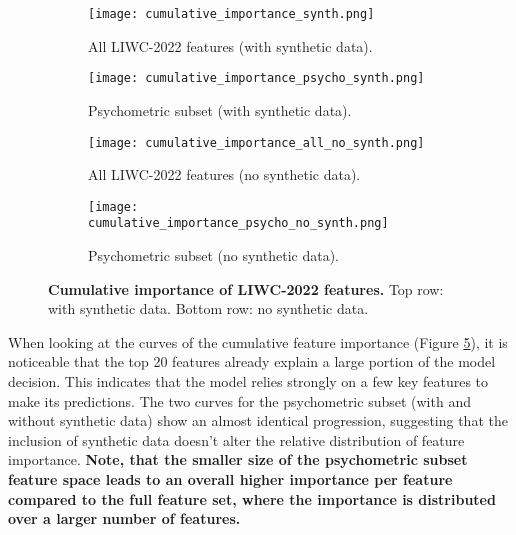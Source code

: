 \begin{figure}[H]
  \centering
  
  \begin{subfigure}[t]{0.49\textwidth}
    \centering
    \texttt{[image: cumulative\_importance\_synth.png]}
    \caption{All LIWC-2022 features (with synthetic data).}
    \label{fig:cum_synth_all}
  \end{subfigure}\hfill
  \begin{subfigure}[t]{0.49\textwidth}
    \centering
    \texttt{[image: cumulative\_importance\_psycho\_synth.png]}
    \caption{Psychometric subset (with synthetic data).}
    \label{fig:cum_synth_psycho}
  \end{subfigure}
  
  \vspace{0.5cm}
  
  \begin{subfigure}[t]{0.49\textwidth}
    \centering
    \texttt{[image: cumulative\_importance\_all\_no\_synth.png]}
    \caption{All LIWC-2022 features (no synthetic data).}
    \label{fig:cum_no_synth_all}
  \end{subfigure}\hfill
  \begin{subfigure}[t]{0.49\textwidth}
    \centering
    \texttt{[image: cumulative\_importance\_psycho\_no\_synth.png]}
    \caption{Psychometric subset (no synthetic data).}
    \label{fig:cum_no_synth_psycho}
  \end{subfigure}

  \caption[Cumulative importance of LIWC-2022 features.]{\textbf{Cumulative importance of LIWC-2022 features.} 
  Top row: with synthetic data. Bottom row: no synthetic data.}
  \label{fig:cumulative_feature_importance_combined}
\end{figure}

When looking at the curves of the cumulative feature importance (Figure \ref{fig:cumulative_feature_importance_combined}), it is noticeable that the top 20 features already explain a large portion of the model decision. This indicates that the model relies strongly on a few key features to make its predictions. The two curves for the psychometric subset (with and without synthetic data) show an almost identical progression, suggesting that the inclusion of synthetic data doesn't alter the relative distribution of feature importance. \textbf{Note, that the smaller size of the psychometric subset feature space leads to an overall higher importance per feature compared to the full feature set, where the importance is distributed over a larger number of features.}

